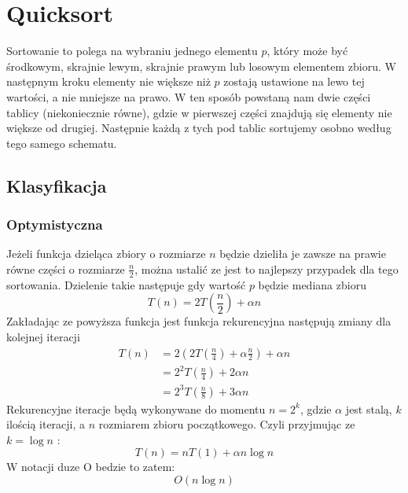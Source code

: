 

\section{Quicksort}
Sortowanie to polega na wybraniu jednego elementu $p$, który może być środkowym, skrajnie lewym, skrajnie prawym lub losowym elementem zbioru. W następnym kroku elementy nie większe niż $p$ zostają ustawione na lewo tej wartości, a nie mniejsze na prawo. W ten sposób powstaną nam dwie części tablicy (niekoniecznie równe), gdzie w pierwszej części znajdują się elementy nie większe od drugiej. Następnie każdą z tych pod tablic sortujemy osobno według tego samego schematu. 
\subsection{Klasyfikacja}
\subsubsection{Optymistyczna}
Jeżeli funkcja dzieląca zbiory o rozmiarze $n$ będzie dzieliła je zawsze na prawie równe części o rozmiarze $\frac{n}{2}$, można ustalić ze jest to najlepszy przypadek dla tego sortowania. Dzielenie takie następuje gdy wartość $p$ będzie mediana zbioru \cite{quicksort}
\begin{equation*}
T(n) = 2T(\frac{n}{2}) +\alpha n
\end{equation*}
Zakładając ze powyższa funkcja jest funkcja rekurencyjna następują zmiany dla kolejnej iteracji
\begin{align*}
 T(n) &= 2(2T(\frac{n}{4}) + \alpha \frac{n}{2}) + \alpha n \\
      &= 2^{2}T( \frac{n}{4}) + 2 \alpha n \\
      &= 2^{3}T( \frac{n}{8}) + 3 \alpha n
 \end{align*}
Rekurencyjne iteracje będą wykonywane do momentu $n = 2^{k}$, gdzie $\alpha$ jest  stalą, $k$ ilością iteracji, a $n$ rozmiarem zbioru początkowego. Czyli przyjmując ze $k = \log n$ :
\begin{equation*}
T(n) =nT(1) +\alpha n \log n
\end{equation*}
W notacji duze O bedzie to zatem:
\begin{equation*}
O(n \log n)
\end{equation*}

